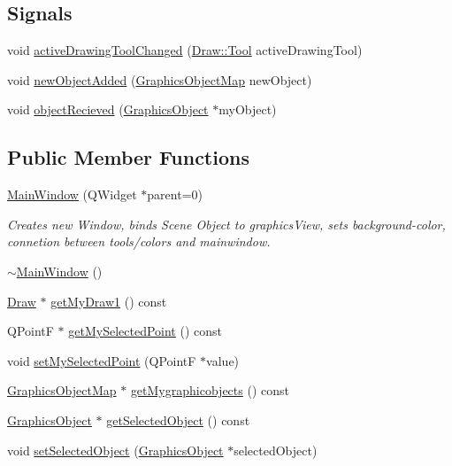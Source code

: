 \subsection*{Signals}
\begin{DoxyCompactItemize}
\item 
void \hyperlink{class_main_window_ac5cc69c34f6beb8f83484514c712fb7e}{active\+Drawing\+Tool\+Changed} (\hyperlink{class_draw_aef97a848de7a634c35c3ce678be88b9b}{Draw\+::\+Tool} active\+Drawing\+Tool)
\item 
void \hyperlink{class_main_window_abe7ef25ca37ca363b6c7f78ef548c69b}{new\+Object\+Added} (\hyperlink{class_graphics_object_map}{Graphics\+Object\+Map} new\+Object)
\item 
void \hyperlink{class_main_window_a07dfbe26675270347f81cf39de3feb7d}{object\+Recieved} (\hyperlink{class_graphics_object}{Graphics\+Object} $\ast$my\+Object)
\end{DoxyCompactItemize}
\subsection*{Public Member Functions}
\begin{DoxyCompactItemize}
\item 
\hyperlink{class_main_window_a8b244be8b7b7db1b08de2a2acb9409db}{Main\+Window} (Q\+Widget $\ast$parent=0)
\begin{DoxyCompactList}\small\item\em Creates new Window, binds Scene Object to graphics\+View, sets background-\/color, connetion between tools/colors and mainwindow. \end{DoxyCompactList}\item 
\hyperlink{class_main_window_ae98d00a93bc118200eeef9f9bba1dba7}{$\sim$\+Main\+Window} ()
\item 
\hyperlink{class_draw}{Draw} $\ast$ \hyperlink{class_main_window_a6532642576d372d482fe65a75f1b3625}{get\+My\+Draw1} () const
\item 
Q\+PointF $\ast$ \hyperlink{class_main_window_a534d46f1227675db3c7c0a92eb525159}{get\+My\+Selected\+Point} () const
\item 
void \hyperlink{class_main_window_aa19b7a63d9094a1984a4744041feb62a}{set\+My\+Selected\+Point} (Q\+PointF $\ast$value)
\item 
\hyperlink{class_graphics_object_map}{Graphics\+Object\+Map} $\ast$ \hyperlink{class_main_window_a03e97a4c381756e59848495721bff9be}{get\+Mygraphicobjects} () const
\item 
\hyperlink{class_graphics_object}{Graphics\+Object} $\ast$ \hyperlink{class_main_window_a74ee7691487d90479ea2244f2815d01f}{get\+Selected\+Object} () const
\item 
void \hyperlink{class_main_window_a6ec62901bdc71edb074b5b3dc8caf407}{set\+Selected\+Object} (\hyperlink{class_graphics_object}{Graphics\+Object} $\ast$selected\+Object)
\end{DoxyCompactItemize}


